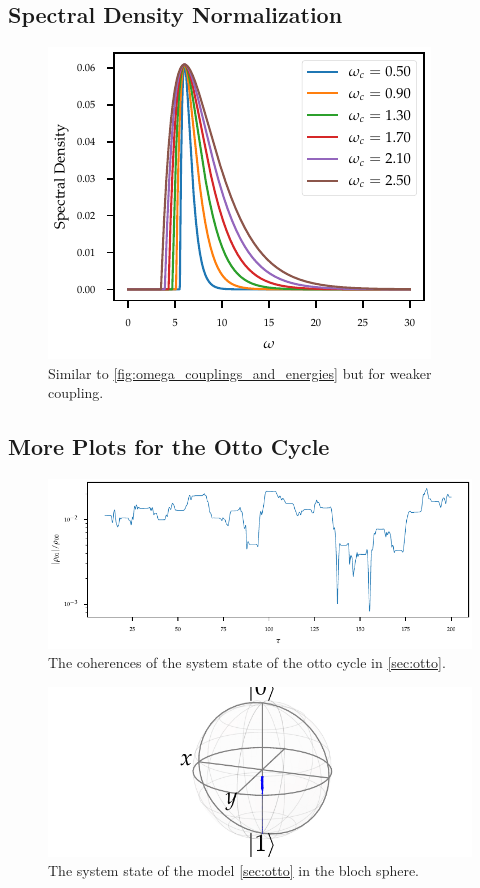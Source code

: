 \subsection{Spectral Density Normalization}
\label{sec:spec_densities}
\begin{figure}[H]
  \centering
  \includegraphics{figs/one_bath_mod/omega_sd_weak}
  \caption{\label{fig:omega_couplings_weak} Similar
    to \cref{fig:omega_couplings_and_energies} but for weaker coupling.}
\end{figure}


\subsection{More Plots for the Otto Cycle}
\label{sec:otto_plots}
\begin{figure}[H]
  \centering
  \includegraphics{figs/otto/coherences}
  \caption{\label{eq:otto_coherences} The coherences of the system
    state of the otto cycle in \cref{sec:otto}.}
\end{figure}
\begin{figure}[H]
  \centering
  \includegraphics{figs/otto/bloch}
  \caption{\label{eq:otto_bloch} The system state of the model
    \cref{sec:otto} in the bloch sphere.}
\end{figure}

